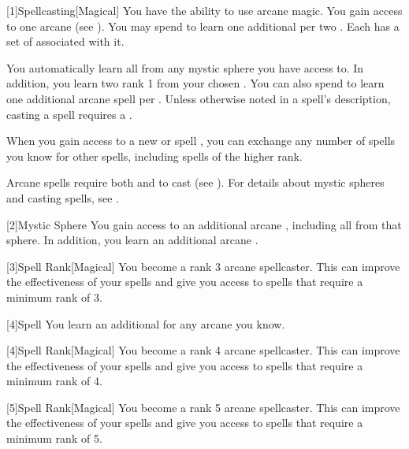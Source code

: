        [1]{Spellcasting}[Magical]
        You have the ability to use arcane magic.
        You gain access to one arcane  (see ).
        You may spend  to learn one additional  per two .
        Each  has a set of  associated with it.

        You automatically learn all  from any mystic sphere you have access to.
        In addition, you learn two rank 1  from your chosen .
        You can also spend  to learn one additional arcane spell per .
        Unless otherwise noted in a spell's description, casting a spell requires a .

        When you gain access to a new  or spell ,
            you can exchange any number of spells you know for other spells,
            including spells of the higher rank.

        Arcane spells require both  and  to cast (see ).
        For details about mystic spheres and casting spells, see .

        [2]{Mystic Sphere} You gain access to an additional arcane , including all  from that sphere.
        In addition, you learn an additional arcane .

        [3]{Spell Rank}[Magical] You become a rank 3 arcane spellcaster.
        This can improve the effectiveness of your spells and give you access to spells that require a minimum rank of 3.

        [4]{Spell} You learn an additional  for any arcane  you know.

        [4]{Spell Rank}[Magical] You become a rank 4 arcane spellcaster.
        This can improve the effectiveness of your spells and give you access to spells that require a minimum rank of 4.

        [5]{Spell Rank}[Magical] You become a rank 5 arcane spellcaster.
        This can improve the effectiveness of your spells and give you access to spells that require a minimum rank of 5.

